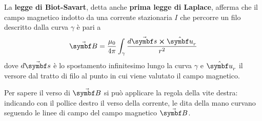 \begin{define}
	La \textbf{legge di Biot-Savart}, detta anche \textbf{prima legge di Laplace}, afferma che il campo magnetico indotto da una corrente stazionaria $I$ che percorre un filo descritto dalla curva $\gamma$ è pari a
	\begin{equation}
		\vba{B}=\frac{\mu_0}{4\pi}\int_{\gamma}\frac{d\vba{s}\cross\vbh{u}_r}{r^2}
	\end{equation}
	dove $d\vba{s}$ è lo spostamento infinitesimo lungo la curva $\gamma$ e $\vbh{u}_r$ il versore dal tratto di filo al punto in cui viene valutato il campo magnetico. 
\end{define}
\begin{observe}
	Per sapere il verso di $\vba{B}$ si può applicare la regola della vite destra: indicando con il pollice destro il verso della corrente, le dita della mano curvano seguendo le linee di campo del campo magnetico $\vba{B}$.
\end{observe}
